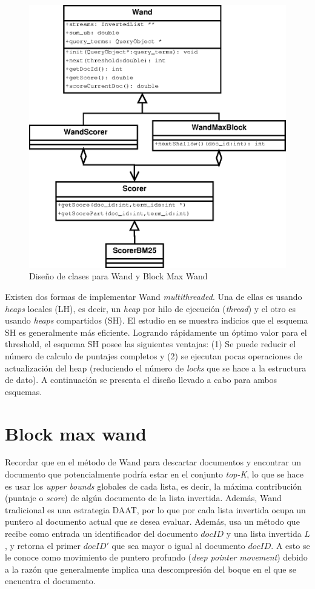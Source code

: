 \begin{figure}[!th]
\centering
\includegraphics[scale=.75]{images/WAND.eps}
\caption{Diseño de clases para Wand y Block Max Wand}
\label{fig:diagramawand}
\end{figure}

Existen dos formas de implementar Wand \textit{multithreaded}. Una de ellas es usando \textit{heaps} locales (LH), es decir, un \textit{heap} por hilo de ejecución (\textit{thread}) y el otro es usando \textit{heaps} compartidos (SH). El estudio en \citep{Rojas:2013} se muestra indicios que el esquema SH es generalmente más eficiente. Logrando rápidamente un óptimo valor para el threshold, el esquema SH posee las siguientes ventajas: (1) Se puede reducir el número de calculo de puntajes completos y (2) se ejecutan pocas operaciones de actualización del heap (reduciendo el número de \textit{locks} que se hace a la estructura de dato). A continuación se presenta el diseño llevado a cabo para ambos esquemas.

\section{Block max wand}
Recordar que en el método de Wand para descartar documentos y encontrar un documento que potencialmente podría estar en el conjunto \textit{top-K}, lo que se hace es usar los \textit{upper bounds} globales de cada lista, es decir, la máxima contribución (puntaje o \textit{score}) de algún documento de la lista invertida. Además, Wand tradicional es una estrategia DAAT, por lo que por cada lista invertida ocupa un puntero al documento actual que se desea evaluar. Además, usa un método que recibe como entrada un identificador del documento $docID$ y una lista invertida $L$, y retorna el primer $docID'$ que sea mayor o igual al documento $docID$. A esto se le conoce como movimiento de puntero profundo (\textit{deep pointer movement}) debido a la razón que generalmente implica una descompresión del boque en el que se encuentra el documento.


